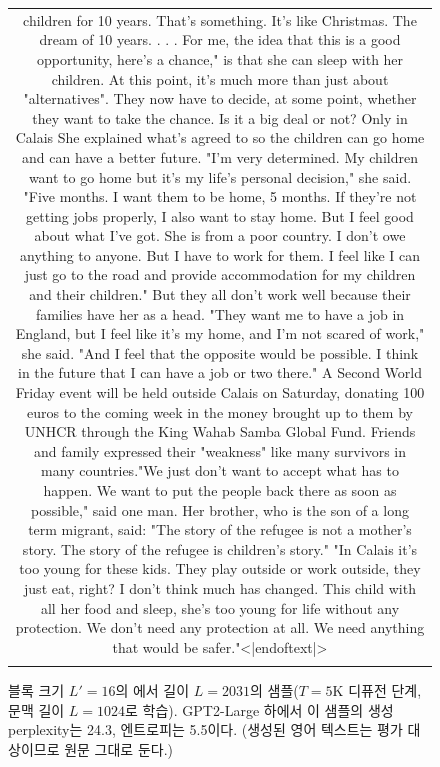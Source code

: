 \begin{figure}[H]
\begin{tabular}{c}
{\begin{minipage}{0.9\textwidth}
children for 10 years. That's something. It's like Christmas. The dream of 10 years. . . . For me, the idea that this is a good opportunity, here's a chance," is that she can sleep with her children. At this point, it's much more than just about "alternatives". They now have to decide, at some point, whether they want to take the chance. Is it a big deal or not? Only in Calais She explained what's agreed to so the children can go home and can have a better future. "I'm very determined. My children want to go home but it's my life's personal decision," she said. "Five months. I want them to be home, 5 months. If they're not getting jobs properly, I also want to stay home. But I feel good about what I've got. She is from a poor country. I don't owe anything to anyone. But I have to work for them. I feel like I can just go to the road and provide accommodation for my children and their children." But they all don't work well because their families have her as a head. "They want me to have a job in England, but I feel like it's my home, and I'm not scared of work," she said. "And I feel that the opposite would be possible. I think in the future that I can have a job or two there." A Second World Friday event will be held outside Calais on Saturday, donating 100 euros to the coming week in the money brought up to them by UNHCR through the King Wahab Samba Global Fund. Friends and family expressed their "weakness" like many survivors in many countries."We just don't want to accept what has to happen. We want to put the people back there as soon as possible," said one man. Her brother, who is the son of a long term migrant, said: "The story of the refugee is not a mother's story. The story of the refugee is children's story." "In Calais it's too young for these kids. They play outside or work outside, they just eat, right? I don't think much has changed. This child with all her food and sleep, she's too young for life without any protection. We don't need any protection at all. We need anything that would be safer."<|endoftext|>
    \end{minipage}} \\
    \\
    \end{tabular}
    \caption{블록 크기 $L'=16$의 \algo{}에서 길이 $L=2031$의 샘플($T=5$K 디퓨전 단계, 문맥 길이 $L=1024$로 학습). GPT2-Large 하에서 이 샘플의 생성 perplexity는 24.3, 엔트로피는 5.5이다. (생성된 영어 텍스트는 평가 대상이므로 원문 그대로 둔다.)}
    \label{sar-samples}
\end{figure}



